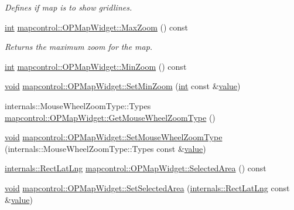 \begin{DoxyCompactItemize}
\begin{DoxyCompactList}\small\item\em Defines if map is to show gridlines. \end{DoxyCompactList}\item 
\hyperlink{ioapi_8h_a787fa3cf048117ba7123753c1e74fcd6}{int} \hyperlink{group___o_p_map_widget_ga20e653fc57f65044824fd9697d9111a8}{mapcontrol\-::\-O\-P\-Map\-Widget\-::\-Max\-Zoom} () const 
\begin{DoxyCompactList}\small\item\em Returns the maximum zoom for the map. \end{DoxyCompactList}\item 
\hyperlink{ioapi_8h_a787fa3cf048117ba7123753c1e74fcd6}{int} \hyperlink{group___o_p_map_widget_ga331965564954b53f6fa29812ae5c8f4b}{mapcontrol\-::\-O\-P\-Map\-Widget\-::\-Min\-Zoom} () const 
\item 
\hyperlink{group___u_a_v_objects_plugin_ga444cf2ff3f0ecbe028adce838d373f5c}{void} \hyperlink{group___o_p_map_widget_gaf973bb53af546323b7714f8715bb527d}{mapcontrol\-::\-O\-P\-Map\-Widget\-::\-Set\-Min\-Zoom} (\hyperlink{ioapi_8h_a787fa3cf048117ba7123753c1e74fcd6}{int} const \&\hyperlink{glext_8h_aa0e2e9cea7f208d28acda0480144beb0}{value})
\item 
internals\-::\-Mouse\-Wheel\-Zoom\-Type\-::\-Types \hyperlink{group___o_p_map_widget_gaccdd5b2b818dd9add21788954c49eabe}{mapcontrol\-::\-O\-P\-Map\-Widget\-::\-Get\-Mouse\-Wheel\-Zoom\-Type} ()
\item 
\hyperlink{group___u_a_v_objects_plugin_ga444cf2ff3f0ecbe028adce838d373f5c}{void} \hyperlink{group___o_p_map_widget_ga24fd1f0f732f8306c89d00997f9957e1}{mapcontrol\-::\-O\-P\-Map\-Widget\-::\-Set\-Mouse\-Wheel\-Zoom\-Type} (internals\-::\-Mouse\-Wheel\-Zoom\-Type\-::\-Types const \&\hyperlink{glext_8h_aa0e2e9cea7f208d28acda0480144beb0}{value})
\item 
\hyperlink{structinternals_1_1_rect_lat_lng}{internals\-::\-Rect\-Lat\-Lng} \hyperlink{group___o_p_map_widget_gaa5afd1049e526ae7424065bca8308106}{mapcontrol\-::\-O\-P\-Map\-Widget\-::\-Selected\-Area} () const 
\item 
\hyperlink{group___u_a_v_objects_plugin_ga444cf2ff3f0ecbe028adce838d373f5c}{void} \hyperlink{group___o_p_map_widget_ga39fb72ad777f823ecaba3f30feb9e623}{mapcontrol\-::\-O\-P\-Map\-Widget\-::\-Set\-Selected\-Area} (\hyperlink{structinternals_1_1_rect_lat_lng}{internals\-::\-Rect\-Lat\-Lng} const \&\hyperlink{glext_8h_aa0e2e9cea7f208d28acda0480144beb0}{value})
\item 

\end{DoxyCompactItemize}

